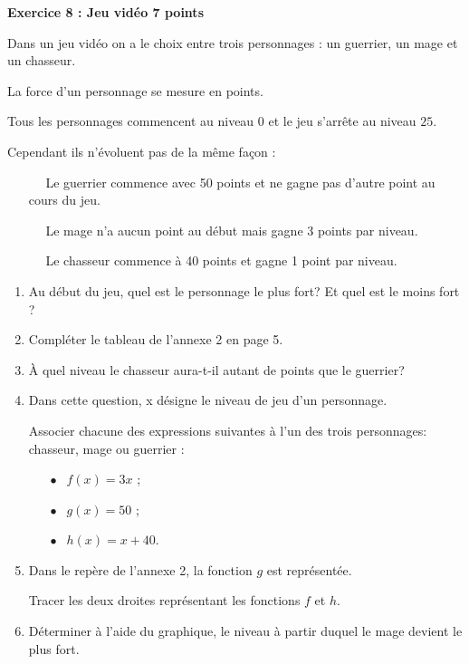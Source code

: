 \textbf{Exercice 8 : Jeu vidéo \hfill 7 points}

\bigskip
 
Dans un jeu vidéo on a le choix entre trois personnages : un guerrier, un mage et un chasseur. 

La force d'un personnage se mesure en points.
 
Tous les personnages commencent au niveau $0$ et le jeu s'arrête au niveau $25$. 

Cependant ils n'évoluent pas de la même façon :

\setlength\parindent{8mm} 
\begin{itemize}
\item[\decoone~~] Le guerrier commence avec 50 points et ne gagne pas d'autre point au cours du jeu. 
\item[\decoone~~] Le mage n'a aucun point au début mais gagne 3 points par niveau. 
\item[\decoone~~] Le chasseur commence à 40 points et gagne 1 point par niveau. 
\end{itemize}
\setlength\parindent{0mm}

\medskip

\begin{enumerate}
\item Au début du jeu, quel est le personnage le plus fort? Et quel est le moins fort ? 
\item Compléter le tableau de l'annexe 2 en page 5. 
\item À quel niveau le chasseur aura-t-il autant de points que le guerrier? 
\item Dans cette question, x désigne le niveau de jeu d'un personnage. 

Associer chacune des expressions suivantes à l'un des trois personnages: chasseur, mage ou guerrier :
 
\setlength\parindent{8mm} 
\begin{itemize}
\item[$\bullet~~$] $f(x) = 3x$ ; 
\item[$\bullet~~$] $g(x) = 50$ ; 
\item[$\bullet~~$] $h(x) = x + 40$.
\end{itemize}
\setlength\parindent{0mm}
 
\item Dans le repère de l'annexe 2, la fonction $g$ est représentée. 

Tracer les deux droites représentant les fonctions $f$ et $h$. 
\item Déterminer à l'aide du graphique, le niveau à partir duquel le mage devient le plus fort. 
\end{enumerate} 

